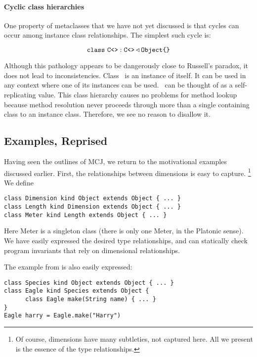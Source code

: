 \documentclass{acmconfbig}
\begin{document}
\paragraph{Cyclic class hierarchies}
One property of metaclasses that we have not yet discussed is that
cycles can occur among instance class relationships. The simplest such
cycle is:

\begin{displaymath}
\mbox{\tt class}\ {\mbox {\tt C}}\mbox{\tt <}\mbox{\tt >} : {\mbox {\tt C}}\mbox{\tt <}\mbox{\tt >} \triangleleft \mbox{\tt Object} \mbox{\tt \{}\mbox{\tt \}}
\end{displaymath}

Although this pathology appears to be dangerously close to Russell's
paradox, it does not lead to inconsistencies.  Class \C\ is an
instance of itself. It can be used in any context where one of its
instances can be used.  \C\ can be thought of as a self-replicating
value. This class hierarchy causes no problems for method lookup
because method resolution never proceeds through more than a single
containing class to an instance class. Therefore, we see no reason to
disallow it.


\subsection{Examples, Reprised}

\label{examples}

Having seen the outlines of MCJ, we return to the motivational
examples discussed earlier.  First, the relationships between
dimensions is easy to capture. \footnote{Of course, dimensions have
many subtleties, not captured here.  All we present is the essence of
the type relationships.} We define 

\begin{verbatim}
class Dimension kind Object extends Object { ... }
class Length kind Dimension extends Object { ... }
class Meter kind Length extends Object { ... }
\end{verbatim}

Here {\txt Meter} is a singleton class (there is only one Meter, in
the Platonic sense).  We have easily expressed the desired type
relationships, and can statically check program invariants that rely
on dimensional relationships.

The example from \cite{FW96} is also easily expressed:

\begin{verbatim}
class Species kind Object extends Object { ... }
class Eagle kind Species extends Object {
      class Eagle make(String name) { ... }
}
Eagle harry = Eagle.make("Harry")
\end{verbatim}
\end{document}
